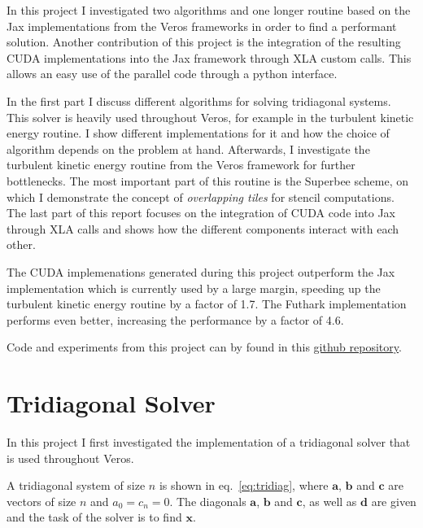 \documentclass[a4paper,oneside]{memoir}
\begin{document}
In this project I investigated two algorithms and one longer routine based on the Jax implementations from the Veros frameworks in order to find a performant solution.
Another contribution of this project is the integration of the resulting CUDA implementations into the Jax framework through XLA custom calls. This allows an easy use of the parallel code through a python interface.

In the first part I discuss different algorithms for solving tridiagonal systems. This solver is heavily used throughout Veros, for example in the turbulent kinetic energy routine. I show different implementations for it and how the choice of algorithm depends on the problem at hand. Afterwards, I investigate the turbulent kinetic energy routine from the Veros framework for further bottlenecks. The most important part of this routine is the Superbee scheme, on which I demonstrate the concept of \emph{overlapping tiles} for stencil computations.
The last part of this report focuses on the integration of CUDA code into Jax through XLA calls and shows how the different components interact with each other.

The CUDA implemenations generated during this project outperform the Jax implementation which is currently used by a large margin, speeding up the turbulent kinetic energy routine by a factor of 1.7. The Futhark implementation performs even better, increasing the performance by a factor of 4.6.

Code and experiments from this project can by found in this \href{https://github.com/Sefrin/ocean_modelling}{github repository}. 

\section{Tridiagonal Solver}
In this project I first investigated the implementation of a tridiagonal solver that is used throughout Veros. 

A tridiagonal system of size $n$ is shown in eq.~\ref{eq:tridiag}, where $\bm{a}$, $\bm{b}$ and $\bm{c}$ are vectors of size $n$ and $a_0 = c_n = 0$.
The diagonals $\bm{a}$, $\bm{b}$ and $\bm{c}$, as well as $\bm{d}$ are given and the task of the solver is to find $\bm{x}$.
\end{document}
